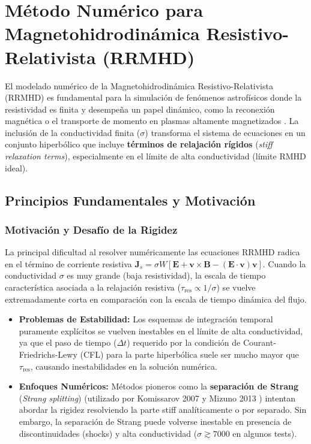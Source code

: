 
\section{Método Numérico para Magnetohidrodinámica Resistivo-Relativista (RRMHD)}
\label{sec:metodo_numerico_rrmhd}

El modelado numérico de la Magnetohidrodinámica Resistivo-Relativista (RRMHD) es fundamental para la simulación de fenómenos astrofísicos donde la resistividad es finita y desempeña un papel dinámico, como la reconexión magnética o el transporte de momento en plasmas altamente magnetizados \cite{11, 387, 457}. La inclusión de la conductividad finita ($\sigma$) transforma el sistema de ecuaciones en un conjunto hiperbólico que incluye \textbf{términos de relajación rígidos} (\textit{stiff relaxation terms}), especialmente en el límite de alta conductividad (límite RMHD ideal).

\subsection{Principios Fundamentales y Motivación}

\subsubsection{Motivación y Desafío de la Rigidez}
La principal dificultad al resolver numéricamente las ecuaciones RRMHD radica en el término de corriente resistiva $\mathbf{J}_s = \sigma W [\mathbf{E} + \mathbf{v} \times \mathbf{B} - (\mathbf{E} \cdot \mathbf{v})\mathbf{v}]$. Cuando la conductividad $\sigma$ es muy grande (baja resistividad), la escala de tiempo característica asociada a la relajación resistiva ($\tau_{\text{res}} \propto 1/\sigma$) se vuelve extremadamente corta en comparación con la escala de tiempo dinámica del flujo.

\begin{itemize}
    \item \textbf{Problemas de Estabilidad:} Los esquemas de integración temporal puramente explícitos se vuelven inestables en el límite de alta conductividad, ya que el paso de tiempo ($\Delta t$) requerido por la condición de Courant-Friedrichs-Lewy (CFL) para la parte hiperbólica suele ser mucho mayor que $\tau_{\text{res}}$, causando inestabilidades en la solución numérica.
    \item \textbf{Enfoques Numéricos:} Métodos pioneros como la \textbf{separación de Strang} (\textit{Strang splitting}) (utilizado por Komissarov 2007 y Mizuno 2013 \cite{12, 15, 388}) intentan abordar la rigidez resolviendo la parte stiff analíticamente o por separado. Sin embargo, la separación de Strang puede volverse inestable en presencia de discontinuidades (shocks) y alta conductividad ($\sigma \gtrsim 7000$ en algunos tests).
\end{itemize}

